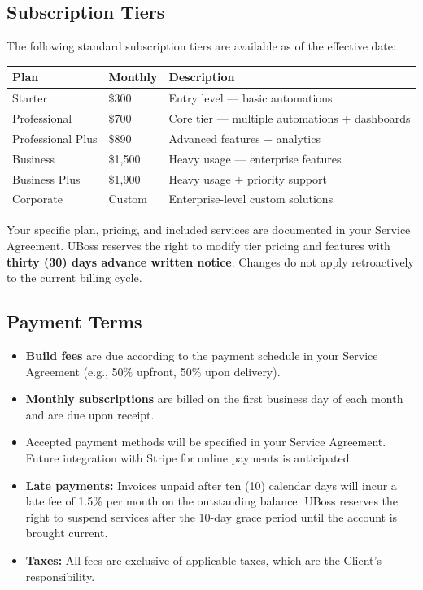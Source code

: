 \documentclass[11pt,letterpaper,parskip=half]{scrartcl}
\begin{document}
\subsection{Subscription Tiers}

The following standard subscription tiers are available as of the effective date:

\begin{center}
\begin{tabularx}{\textwidth}{l l X}
    \toprule
    \textbf{Plan} & \textbf{Monthly} & \textbf{Description} \\
    \midrule
    Starter & \$300 & Entry level --- basic automations \\
    Professional & \$700 & Core tier --- multiple automations + dashboards \\
    Professional Plus & \$890 & Advanced features + analytics \\
    Business & \$1,500 & Heavy usage --- enterprise features \\
    Business Plus & \$1,900 & Heavy usage + priority support \\
    Corporate & Custom & Enterprise-level custom solutions \\
    \bottomrule
\end{tabularx}
\end{center}

Your specific plan, pricing, and included services are documented in your Service Agreement. UBoss reserves the right to modify tier pricing and features with \textbf{thirty (30) days advance written notice}. Changes do not apply retroactively to the current billing cycle.

\subsection{Payment Terms}

\begin{itemize}[nosep, leftmargin=1.5em]
    \item \textbf{Build fees} are due according to the payment schedule in your Service Agreement (e.g., 50\% upfront, 50\% upon delivery).
    \item \textbf{Monthly subscriptions} are billed on the first business day of each month and are due upon receipt.
    \item Accepted payment methods will be specified in your Service Agreement. Future integration with Stripe for online payments is anticipated.
    \item \textbf{Late payments:} Invoices unpaid after ten (10) calendar days will incur a late fee of 1.5\% per month on the outstanding balance. UBoss reserves the right to suspend services after the 10-day grace period until the account is brought current.
    \item \textbf{Taxes:} All fees are exclusive of applicable taxes, which are the Client's responsibility.
\end{itemize}
\end{document}

